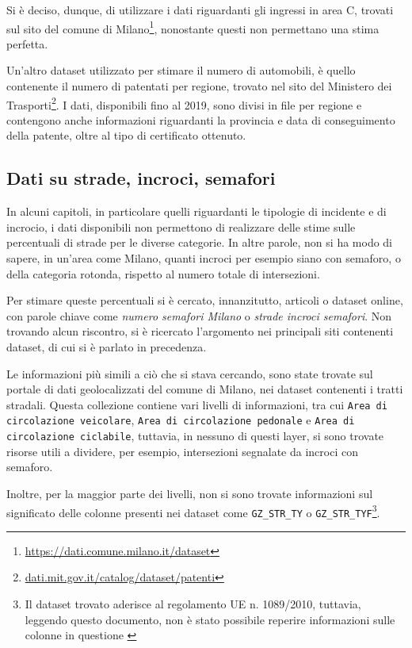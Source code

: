 \documentclass[a4paper,12pt]{report}
\newcommand{\columnstyle}[1]{\texttt{#1}}
\newcommand{\quotestyle}[1]{\textit{#1}}
\begin{document}
Si è deciso, dunque, di utilizzare i dati riguardanti gli ingressi in area C, 
trovati sul sito del comune di Milano\footnote{\url{https://dati.comune.milano.it/dataset}}, 
nonostante questi non permettano una stima perfetta. 

Un'altro dataset utilizzato per stimare il numero di automobili, è quello contenente 
il numero di patentati per regione, trovato nel sito del Ministero dei 
Trasporti\footnote{\url{dati.mit.gov.it/catalog/dataset/patenti}}. 
I dati, disponibili fino al 2019, sono divisi in file per regione e 
contengono anche informazioni riguardanti la provincia e data di conseguimento della 
patente, oltre al tipo di certificato ottenuto. 

\subsection{Dati su strade, incroci, semafori}

In alcuni capitoli, in particolare quelli riguardanti le tipologie di incidente e 
di incrocio, i dati disponibili non permettono di realizzare delle stime sulle 
percentuali di strade per le diverse categorie. 
In altre parole, non si ha modo di sapere, in un'area come Milano, quanti incroci 
per esempio siano con semaforo, o della categoria rotonda, 
rispetto al numero totale di intersezioni. 

Per stimare queste percentuali si è cercato, innanzitutto, articoli o dataset online, con 
parole chiave come \quotestyle{numero semafori Milano} o \quotestyle{strade incroci semafori}. 
Non trovando alcun riscontro, si è ricercato l'argomento nei principali siti contenenti 
dataset, di cui si è parlato in precedenza. 

Le informazioni più simili a ciò che si stava cercando, 
sono state trovate sul portale di dati geolocalizzati 
del comune di Milano, nei dataset contenenti i tratti stradali. 
Questa collezione contiene vari livelli di informazioni, tra cui 
\columnstyle{Area di circolazione veicolare}, 
\columnstyle{Area di circolazione pedonale} e \columnstyle{Area di circolazione ciclabile}, 
tuttavia, in nessuno di questi layer, si sono trovate risorse utili a dividere, 
per esempio, intersezioni segnalate da incroci con semaforo. 

Inoltre, per la maggior parte dei livelli, non si sono trovate informazioni sul significato 
delle colonne presenti nei dataset come \columnstyle{GZ\_STR\_TY} o 
\columnstyle{GZ\_STR\_TYF}\footnote{Il dataset trovato aderisce al regolamento UE n. 1089/2010, 
tuttavia, leggendo questo documento, non è stato possibile reperire informazioni sulle colonne 
in questione \cite{REGOLAMENTOUE:1}}. 
\end{document}
